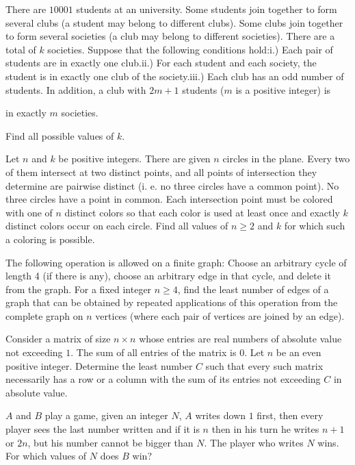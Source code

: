 \item[\textbf{C1.}]There are $10001$ students at an university. Some students join together to form several clubs (a student may belong to different clubs). Some clubs join together to form several societies (a club may belong to different societies). There are a total of $k$ societies. Suppose that the following conditions hold:i.) Each pair of students are in exactly one club.ii.) For each student and each society, the student is in exactly one club of the society.iii.) Each club has an odd number of students. In addition, a club with ${2m+1}$ students ($m$ is a positive integer) is

in exactly $m$ societies.

Find all possible values of $k$.

\item[\textbf{C2.}]Let ${n}$ and $k$ be positive integers. There are given ${n}$ circles in the plane. Every two of them intersect at two distinct points, and all points of intersection they determine are pairwise distinct (i. e. no three circles have a common point). No three circles have a point in common. Each intersection point must be colored with one of $n$ distinct colors so that each color is used at least once and exactly $k$ distinct colors occur on each circle. Find all values of $n\geq 2$ and $k$ for which such a coloring is possible.

\item[\textbf{C3.}]The following operation is allowed on a finite graph: Choose an arbitrary cycle of length 4 (if there is any), choose an arbitrary edge in that cycle, and delete it from the graph. For a fixed integer ${n\ge 4}$,  find the least number of edges of a graph that can be obtained by repeated applications of this operation from the complete graph on $n$ vertices (where each pair of vertices are joined by an edge).

\item[\textbf{C4.}]Consider a matrix of size $n\times n$ whose entries are real numbers of absolute value not exceeding $1$. The sum of all entries of the matrix is $0$. Let $n$ be an even positive integer. Determine the least number $C$ such that every such matrix necessarily has a row or a column with the sum of its entries not exceeding $C$ in absolute value.

\item[\textbf{C5.}]$A$ and $B$ play a game, given an integer $N$,  $A$ writes down $1$ first, then every player sees the last number written and if it is $n$ then in his turn he writes $n+1$ or $2n$,  but his number cannot be bigger than $N$. The player who writes $N$ wins. For which values of $N$ does $B$ win?

